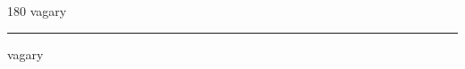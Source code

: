 
\begin{frame}
\begin{center}
\begin{turn}{180}
{\fontsize{2.5cm}{1em}\selectfont vagary}
\end{turn}
\vspace{1em}\par  
\hrule
\vspace{1em}\par  
{\fontsize{2.5cm}{1em}\selectfont vagary}
\end{center}
\end{frame}
